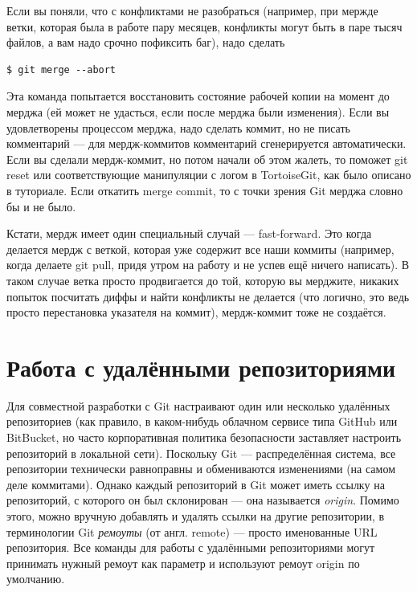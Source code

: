 \documentclass{../../text-style}
\begin{document}
Если вы поняли, что с конфликтами не разобраться (например, при мержде ветки, которая была в работе пару месяцев, конфликты могут быть в паре тысяч файлов, а вам надо срочно пофиксить баг), надо сделать 

\begin{verbatim}
$ git merge --abort
\end{verbatim}

Эта команда попытается восстановить состояние рабочей копии на момент до мерджа (ей может не удасться, если после мерджа были изменения). Если вы удовлетворены процессом мерджа, надо сделать коммит, но не писать комментарий --- для мердж-коммитов комментарий сгенерируется автоматически. Если вы сделали мердж-коммит, но потом начали об этом жалеть, то поможет git reset или соответствующие манипуляции с логом в TortoiseGit, как было описано в туториале. Если откатить merge commit, то с точки зрения Git мерджа словно бы и не было.

Кстати, мердж имеет один специальный случай --- fast-forward. Это когда делается мердж с веткой, которая уже содержит все наши коммиты (например, когда делаете git pull, придя утром на работу и не успев ещё ничего написать). В таком случае ветка просто продвигается до той, которую вы мерджите, никаких попыток посчитать диффы и найти конфликты не делается (что логично, это ведь просто перестановка указателя на коммит), мердж-коммит тоже не создаётся.

\section{Работа с удалёнными репозиториями}

Для совместной разработки с Git настраивают один или несколько удалённых репозиториев (как правило, в каком-нибудь облачном сервисе типа GitHub или BitBucket, но часто корпоративная политика безопасности заставляет настроить репозиторий в локальной сети). Поскольку Git --- распределённая система, все репозитории технически равноправны и обмениваются изменениями (на самом деле коммитами). Однако каждый репозиторий в Git может иметь ссылку на репозиторий, с которого он был склонирован --- она называется \emph{origin}. Помимо этого, можно вручную добавлять и удалять ссылки на другие репозитории, в терминологии Git \emph{ремоуты} (от англ. remote) --- просто именованные URL репозитория. Все команды для работы с удалёнными репозиториями могут принимать нужный ремоут как параметр и используют ремоут origin по умолчанию.
\end{document}
